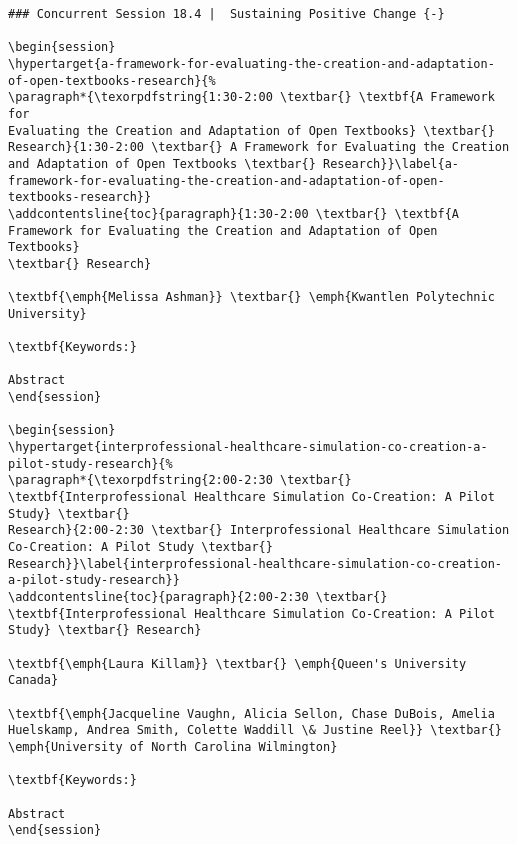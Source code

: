 \documentclass[
]{book}
\begin{document}
\begin{verbatim}
### Concurrent Session 18.4 |  Sustaining Positive Change {-}

\begin{session}
\hypertarget{a-framework-for-evaluating-the-creation-and-adaptation-of-open-textbooks-research}{%
\paragraph*{\texorpdfstring{1:30-2:00 \textbar{} \textbf{A Framework for
Evaluating the Creation and Adaptation of Open Textbooks} \textbar{}
Research}{1:30-2:00 \textbar{} A Framework for Evaluating the Creation and Adaptation of Open Textbooks \textbar{} Research}}\label{a-framework-for-evaluating-the-creation-and-adaptation-of-open-textbooks-research}}
\addcontentsline{toc}{paragraph}{1:30-2:00 \textbar{} \textbf{A
Framework for Evaluating the Creation and Adaptation of Open Textbooks}
\textbar{} Research}

\textbf{\emph{Melissa Ashman}} \textbar{} \emph{Kwantlen Polytechnic
University}

\textbf{Keywords:}

Abstract
\end{session}

\begin{session}
\hypertarget{interprofessional-healthcare-simulation-co-creation-a-pilot-study-research}{%
\paragraph*{\texorpdfstring{2:00-2:30 \textbar{}
\textbf{Interprofessional Healthcare Simulation Co-Creation: A Pilot
Study} \textbar{}
Research}{2:00-2:30 \textbar{} Interprofessional Healthcare Simulation Co-Creation: A Pilot Study \textbar{} Research}}\label{interprofessional-healthcare-simulation-co-creation-a-pilot-study-research}}
\addcontentsline{toc}{paragraph}{2:00-2:30 \textbar{}
\textbf{Interprofessional Healthcare Simulation Co-Creation: A Pilot
Study} \textbar{} Research}

\textbf{\emph{Laura Killam}} \textbar{} \emph{Queen's University Canada}

\textbf{\emph{Jacqueline Vaughn, Alicia Sellon, Chase DuBois, Amelia
Huelskamp, Andrea Smith, Colette Waddill \& Justine Reel}} \textbar{}
\emph{University of North Carolina Wilmington}

\textbf{Keywords:}

Abstract
\end{session}




\end{verbatim}
\end{document}

